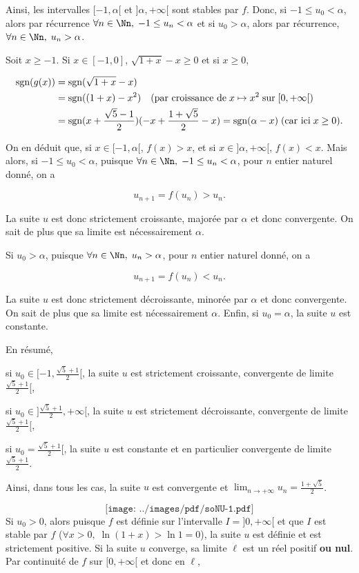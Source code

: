 {{Ainsi, les intervalles $[-1,\alpha[$ et $]\alpha,+\infty[$ sont stables par $f$. Donc, si $-1\leq u_0<\alpha$, alors par récurrence $\forall n\in\Nn,\;-1\leq u_n<\alpha$ et si $u_0>\alpha$, alors par récurrence, $\forall n\in\Nn,\;u_n>\alpha$.

Soit $x\geq-1$. Si $x\in[-1,0]$, $\sqrt{1+x}-x\geq0$ et si $x\geq0$,

\begin{align*}\ensuremath
\mbox{sgn}(g(x))&=\mbox{sgn}(\sqrt{1+x}-x)\\
 &=\mbox{sgn}((1+x)-x^2)\quad(\mbox{par croissance de}\;x\mapsto x^2\;\mbox{sur}\;[0,+\infty[)\\
 &=\mbox{sgn}(x+\frac{\sqrt{5}-1}{2})(-x+\frac{1+\sqrt{5}}{2}-x)=\mbox{sgn}(\alpha-x)\;(\mbox{car ici}\;x\geq0).
\end{align*}

On en déduit que, si $x\in[-1,\alpha[$, $f(x)>x$, et si $x\in]\alpha,+\infty[$, $f(x)<x$. Mais alors, 
si $-1\leq u_0<\alpha$, puisque $\forall n\in\Nn,\;-1\leq u_n<\alpha$, pour $n$ entier naturel donné, on a

$$u_{n+1}=f(u_n)>u_n.$$

La suite $u$ est donc strictement croissante, majorée par $\alpha$ et donc convergente. On sait de plus que sa limite est nécessairement $\alpha$.

Si $u_0>\alpha$, puisque $\forall n\in\Nn,\;u_n>\alpha$, pour $n$ entier naturel donné, on a

$$u_{n+1}=f(u_n)<u_n.$$

La suite $u$ est donc strictement décroissante, minorée par $\alpha$ et donc convergente. On sait de plus que sa limite est nécessairement $\alpha$. Enfin, si $u_0=\alpha$, la suite $u$ est constante.

En résumé,

si $u_0\in[-1,\frac{\sqrt{5}+1}{2}[$, la suite $u$ est strictement croissante, convergente de limite $\frac{\sqrt{5}+1}{2}[$,

si $u_0\in]\frac{\sqrt{5}+1}{2},+\infty[$, la suite $u$ est strictement décroissante, convergente de limite $\frac{\sqrt{5}+1}{2}[$,

si $u_0=\frac{\sqrt{5}+1}{2}[$, la suite $u$ est constante et en particulier convergente de limite $\frac{\sqrt{5}+1}{2}$.

Ainsi, dans tous les cas, la suite $u$ est convergente et $\lim_{n\rightarrow +\infty}u_n=\frac{1+\sqrt{5}}{2}$.

$$\texttt{[image: ../images/pdf/soNU-1.pdf]}$$
Si $u_0>0$, alors puisque $f$ est définie sur l'intervalle $I=]0,+\infty[$ et que $I$ est stable par $f$ ($\forall x>0,\;\ln(1+x)>\ln1=0$), la suite $u$ est définie et est strictement positive. Si la suite $u$ converge, sa limite $\ell$ est un réel positif \textbf{ou nul}. Par continuité de $f$ sur $[0,+\infty[$ et donc en $\ell$,

}}
